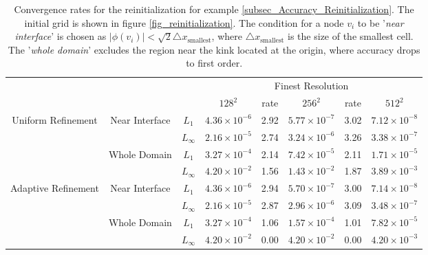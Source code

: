 \documentclass[english]{article}
\begin{document}
\begin{table}
\begin{center}
\begin{tabular}{|c|c|c|c|c|c|c|c|}\hline
\multicolumn{3}{|c|}{} & \multicolumn{5}{|c|}{Finest Resolution}   \\\cline{4-8}
\multicolumn{3}{|c|}{} & $128^2$ & rate & $256^2$ & rate & $512^2$ \\\hline \multirow{4}{0.7
in}{Uniform Refinement} & \multirow{2}{*}{Near Interface}
 & $L_1     $ & $4.36\times10^{-6}$ & 2.92 & $5.77\times10^{-7}$ & 3.02 & $7.12\times10^{-8}$ \\\cline{3-8}
&& $L_\infty$ & $2.16\times10^{-5}$ & 2.74 & $3.24\times10^{-6}$ & 3.26 & $3.38\times10^{-7}$
\\\cline{2-8}
                                       & \multirow{2}{*}{Whole Domain}
 & $L_1     $ & $3.27\times10^{-4}$ & 2.14 & $7.42\times10^{-5}$ & 2.11 & $1.71\times10^{-5}$ \\\cline{3-8}
&& $L_\infty$ & $4.20\times10^{-2}$ & 1.56 & $1.43\times10^{-2}$ & 1.87 & $3.89\times10^{-3}$
\\\hline

\multirow{4}{0.7 in}{Adaptive Refinement} & \multirow{2}{*}{Near Interface}
 & $L_1     $ & $4.36\times10^{-6}$ & 2.94 & $5.70\times10^{-7}$ & 3.00 & $7.14\times10^{-8}$ \\\cline{3-8}
&& $L_\infty$ & $2.16\times10^{-5}$ & 2.87 & $2.96\times10^{-6}$ & 3.09 & $3.48\times10^{-7}$
\\\cline{2-8}
                                         & \multirow{2}{*}{Whole Domain}
 & $L_1     $ & $3.27\times10^{-4}$ & 1.06 & $1.57\times10^{-4}$ & 1.01 & $7.82\times10^{-5}$ \\\cline{3-8}
&& $L_\infty$ & $4.20\times10^{-2}$ & 0.00 & $4.20\times10^{-2}$ & 0.00 & $4.20\times10^{-3}$
\\\hline
\end{tabular}
\end{center}
\caption{Convergence rates for the reinitialization for example
\ref{subsec_Accuracy_Reinitialization}. The initial grid is shown in figure
\ref{fig_reinitialization}. The condition for a node $v_i$ to be
'\textit{near interface}' is chosen as $|\phi(v_i)|<\sqrt{2}\triangle
x_{\text{smallest}}$, where $\triangle x_{\text{smallest}}$ is the size of
the smallest cell. The '\textit{whole domain}' excludes the region near the
kink located at the origin, where accuracy drops to first order.}
\label{tab_reinitialization}
\end{table}
\end{document}
